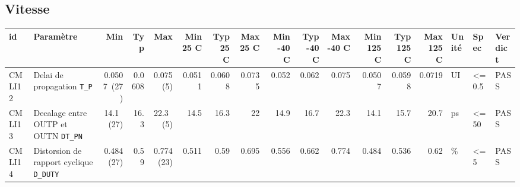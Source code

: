 \documentclass[a4paper,10pt,landscape]{article}
\begin{document}
\subsection*{Vitesse}
{\footnotesize\setlength{\tabcolsep}{3pt}\begin{longtable}{lp{46mm}rrrrrrrrrrrrlp{24mm}p{19mm}}\toprule
id & Param\`etre & Min & Typ & Max & {\tiny Min 25 C} & {\tiny Typ 25 C} & {\tiny Max 25 C} & {\tiny Min -40 C} & {\tiny Typ -40 C} & {\tiny Max -40 C} & {\tiny Min 125 C} & {\tiny Typ 125 C} & {\tiny Max 125 C} & Unit\'e & Spec & Verdict \\ \midrule\endhead
CMLI12 & Delai de propagation {\tiny\texttt{T\_P}} & 0.0507~(27) & 0.0608 & 0.075~(5) & 0.0511 & 0.0608 & 0.0735 & 0.052 & 0.062 & 0.075 & 0.0507 & 0.0598 & 0.0719 & UI & \textless{}= 0.5 & PASS \\
CMLI13 & Decalage entre OUTP et OUTN {\tiny\texttt{DT\_PN}} & 14.1~(27) & 16.3 & 22.3~(5) & 14.5 & 16.3 & 22 & 14.9 & 16.7 & 22.3 & 14.1 & 15.7 & 20.7 & ps & \textless{}= 50 & PASS \\
CMLI14 & Distorsion de rapport cyclique {\tiny\texttt{D\_DUTY}} & 0.484~(27) & 0.59 & 0.774~(23) & 0.511 & 0.59 & 0.695 & 0.556 & 0.662 & 0.774 & 0.484 & 0.536 & 0.62 & \% & \textless{}= 5 & PASS \\
\bottomrule\end{longtable}}
\end{document}
